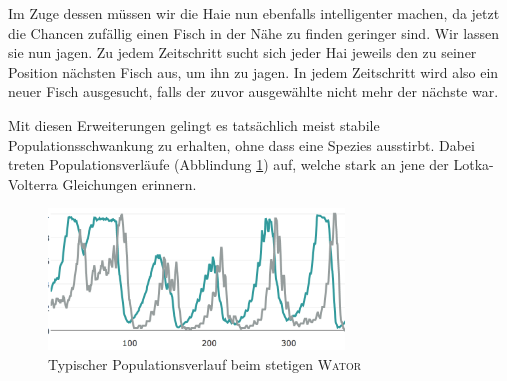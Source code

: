 \documentclass[a4paper,11pt]{article}
\newcommand{\wator}{\textsc{Wator }}
\theoremstyle{definition}
\numberwithin{equation}{section}
\begin{document}
	Im Zuge dessen müssen wir die Haie nun ebenfalls intelligenter machen, da jetzt die Chancen zufällig einen Fisch in der Nähe zu finden geringer sind. Wir lassen sie nun jagen. Zu jedem Zeitschritt sucht sich jeder Hai jeweils den zu seiner Position nächsten Fisch aus, um ihn zu jagen. In jedem Zeitschritt wird also ein neuer Fisch ausgesucht, falls der zuvor ausgewählte nicht mehr der nächste war.\newline
	
	Mit diesen Erweiterungen gelingt es tatsächlich meist stabile Populationsschwankung zu erhalten, ohne dass eine Spezies ausstirbt.
	Dabei treten Populationsverläufe (Abblindung \ref{fig:continuous_diagram}) auf, welche stark an jene der Lotka-Volterra Gleichungen erinnern.
	
	\begin{figure}
	\centering
	\includegraphics[width=0.7\textwidth]{pictures/continuous_diagram.png}
		\caption{Typischer Populationsverlauf beim stetigen \wator}
		\label{fig:continuous_diagram}
	\end{figure}
	
	\listoffigures
	

	\nocite{*}
	\printbibliography[heading=bibintoc]%
	
\end{document}
